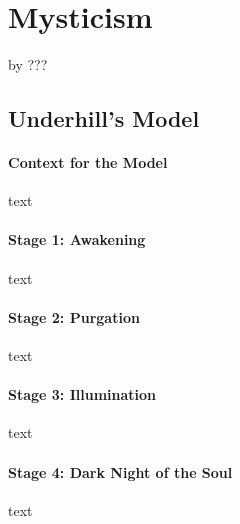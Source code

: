 \chapter{Mysticism}

\begin{authors}
	by ???
\end{authors}



\section{Underhill's Model}

\subsubsection{Context for the Model}

text

\subsubsection{Stage 1: Awakening}

text

\subsubsection{Stage 2: Purgation}

text

\subsubsection{Stage 3: Illumination}

text

\subsubsection{Stage 4: Dark Night of the Soul}

text


